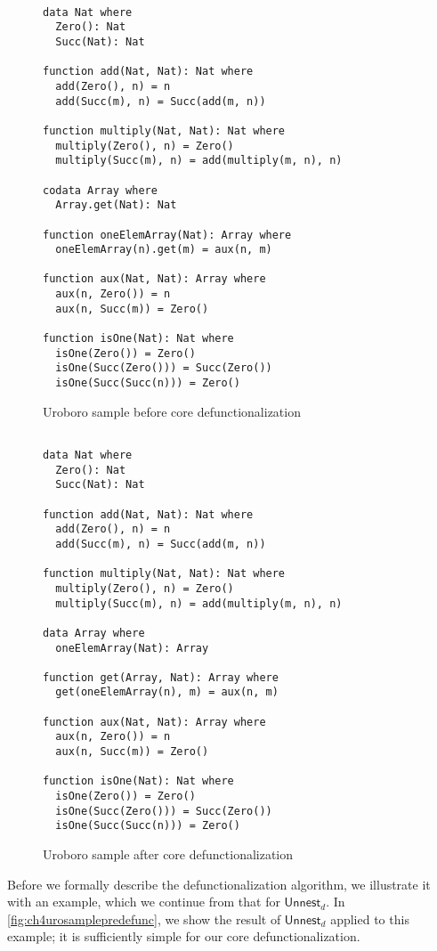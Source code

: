 \begin{figure}
\begin{lstlisting}

data Nat where
  Zero(): Nat
  Succ(Nat): Nat

function add(Nat, Nat): Nat where
  add(Zero(), n) = n
  add(Succ(m), n) = Succ(add(m, n))

function multiply(Nat, Nat): Nat where
  multiply(Zero(), n) = Zero()
  multiply(Succ(m), n) = add(multiply(m, n), n)

codata Array where
  Array.get(Nat): Nat

function oneElemArray(Nat): Array where
  oneElemArray(n).get(m) = aux(n, m)

function aux(Nat, Nat): Array where
  aux(n, Zero()) = n
  aux(n, Succ(m)) = Zero()

function isOne(Nat): Nat where
  isOne(Zero()) = Zero()
  isOne(Succ(Zero())) = Succ(Zero())
  isOne(Succ(Succ(n))) = Zero()

\end{lstlisting}
\caption{Uroboro sample before core defunctionalization}
\label{fig:ch4urosamplepredefunc}
\end{figure}

\begin{figure}
\begin{lstlisting}

data Nat where
  Zero(): Nat
  Succ(Nat): Nat

function add(Nat, Nat): Nat where
  add(Zero(), n) = n
  add(Succ(m), n) = Succ(add(m, n))

function multiply(Nat, Nat): Nat where
  multiply(Zero(), n) = Zero()
  multiply(Succ(m), n) = add(multiply(m, n), n)

data Array where
  oneElemArray(Nat): Array

function get(Array, Nat): Array where
  get(oneElemArray(n), m) = aux(n, m)

function aux(Nat, Nat): Array where
  aux(n, Zero()) = n
  aux(n, Succ(m)) = Zero()

function isOne(Nat): Nat where
  isOne(Zero()) = Zero()
  isOne(Succ(Zero())) = Succ(Zero())
  isOne(Succ(Succ(n))) = Zero()

\end{lstlisting}
\caption{Uroboro sample after core defunctionalization}
\label{fig:ch4urosamplepostdefunc}
\end{figure}

Before we formally describe the defunctionalization algorithm, we illustrate it with an example, which we continue from that for $\textsf{Unnest}_d$. In \autoref{fig:ch4urosamplepredefunc}, we show the result of $\textsf{Unnest}_d$ applied to this example; it is sufficiently simple for our core defunctionalization.

